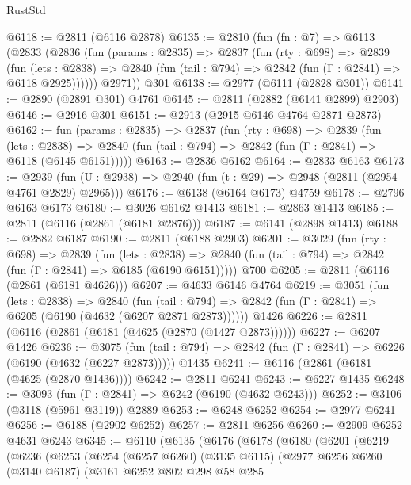 \begin{lexlean}{RustStd}
\begin{coremodule}
@6118 := @2811 (@6116 @2878)
@6135 := @2810
    (fun (fn : @7) =>
    @6113
      (@2833
        (@2836
          (fun (params : @2835) =>
          @2837
            (fun (rty : @698) =>
            @2839
              (fun (lets : @2838) =>
              @2840 (fun (tail : @794) => @2842 (fun (Γ : @2841) => @6118 @2925))))))
        @2971))
    @301
@6138 := @2977 (@6111 (@2828 @301))
@6141 := @2890 (@2891 @301) @4761
@6145 := @2811 (@2882 (@6141 @2899) @2903)
@6146 := @2916 @301
@6151 := @2913 (@2915 @6146 @4764 @2871 @2873)
@6162 := fun (params : @2835) =>
  @2837
    (fun (rty : @698) =>
    @2839
      (fun (lets : @2838) =>
      @2840 (fun (tail : @794) => @2842 (fun (Γ : @2841) => @6118 (@6145 @6151)))))
@6163 := @2836 @6162
@6164 := @2833 @6163
@6173 := @2939 (fun (U : @2938) => @2940 (fun (t : @29) => @2948 (@2811 (@2954 @4761 @2829) @2965)))
@6176 := @6138 (@6164 @6173) @4759
@6178 := @2796 @6163 @6173
@6180 := @3026 @6162 @1413
@6181 := @2863 @1413
@6185 := @2811 (@6116 (@2861 (@6181 @2876)))
@6187 := @6141 (@2898 @1413)
@6188 := @2882 @6187
@6190 := @2811 (@6188 @2903)
@6201 := @3029
    (fun (rty : @698) =>
    @2839
      (fun (lets : @2838) =>
      @2840 (fun (tail : @794) => @2842 (fun (Γ : @2841) => @6185 (@6190 @6151)))))
    @700
@6205 := @2811 (@6116 (@2861 (@6181 @4626)))
@6207 := @4633 @6146 @4764
@6219 := @3051
    (fun (lets : @2838) =>
    @2840
      (fun (tail : @794) => @2842 (fun (Γ : @2841) => @6205 (@6190 (@4632 (@6207 @2871 @2873))))))
    @1426
@6226 := @2811 (@6116 (@2861 (@6181 (@4625 (@2870 (@1427 @2873))))))
@6227 := @6207 @1426
@6236 := @3075
    (fun (tail : @794) => @2842 (fun (Γ : @2841) => @6226 (@6190 (@4632 (@6227 @2873)))))
    @1435
@6241 := @6116 (@2861 (@6181 (@4625 (@2870 @1436))))
@6242 := @2811 @6241
@6243 := @6227 @1435
@6248 := @3093 (fun (Γ : @2841) => @6242 (@6190 (@4632 @6243)))
@6252 := @3106 (@3118 (@5961 @3119)) @2889
@6253 := @6248 @6252
@6254 := @2977 @6241
@6256 := @6188 (@2902 @6252)
@6257 := @2811 @6256
@6260 := @2909 @6252 @4631 @6243
@6345 := @6110
    (@6135
      (@6176
        (@6178
          (@6180
            (@6201
              (@6219
                (@6236
                  (@6253
                    (@6254
                      (@6257 @6260)
                      (@3135 @6115)
                      (@2977
                        @6256
                        @6260
                        (@3140 @6187)
                        (@3161
                          @6252
                          @802
                          @298
                          @58
                          @285

\end{coremodule}
\end{lexlean}
